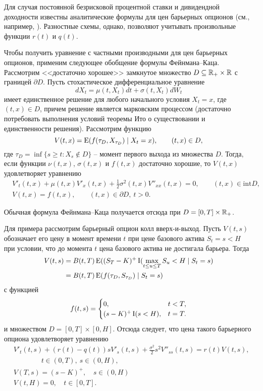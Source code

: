 \begin{remark}
Для случая постоянной безрисковой процентной ставки и дивидендной доходности известны аналитические формулы для цен барьерных опционов (см., например, \cite{Haug06}).
Разностные схемы, однако, позволяют учитывать произвольные функции $r(t)$ и $q(t)$.
\end{remark}

Чтобы получить уравнение с частными производными для цен барьерных опционов, применим следующее обобщение формулы Фейнмана--Каца.
Рассмотрим <<достаточно хорошее>> замкнутое множество  $D \subseteq \mathbb{R}_+\times \mathbb{R}$ с  границей $\partial D$. 
Пусть стохастическое дифференциальное уравнение
\[
d X_t = \mu(t,X_t) dt + \sigma(t,X_t) d W_t
\]
имеет единственное решение для любого начального условия $X_t=x$, где $(t,x)\in D$, причем решение является марковским процессом (достаточно потребовать выполнения условий теоремы Ито о существовании и единственности решения).
Рассмотрим функцию
\[
V(t,x) = \operatorname{E} (f(\tau_D, X_{\tau_D}) \mid X_t = x), \qquad (t,x) \in D,
\]
где $\tau_D = \inf\{s\ge t : X_s \not\in D\}$ -- момент первого выхода из множества $D$. 
Тогда, если функции $\nu(t,x)$, $\sigma(t,x)$ и $f(t,x)$ достаточно хорошие, то $V(t,x)$ удовлетворяет уравнению
\begin{align*}[left=\empheqlbrace]
&V'_t(t,x) + \mu(t,x)V'_x(t,x) + \frac12 \sigma^2(t,x) V''_{xx}(t,x) = 0, \qquad (t,x)\in\mathrm{int} D,\\
&V(t,x) = f(t, x), \qquad (t,x)\in \partial D,\ t>0.
\end{align*}
\begin{remark}
Обычная формула Фейнмана--Каца получается отсюда при $D=[0,T]\times \mathbb{R}_+$.
\end{remark}

Для примера рассмотрим барьерный опцион колл вверх-и-выход.
Пусть $V(t,s)$ обозначает его цену в момент времени $t$ при цене базового актива $S_t=s<H$ при условии, что до момента $t$ цена базового актива не достигала барьера.
Тогда 
\[
\begin{split}
V(t,s) &= B(t,T) \operatorname{E}((S_T-K)^+\operatorname{I}(\max_{t\le u \le T} S_u < H \mid S_t = s) \\
&= B(t,T) \operatorname{E}(f(\tau_D, S_{\tau_D}) \mid S_t=s)
\end{split}
\]
с функцией 
\[
f(t,s) = \begin{cases}
0, &t<T,\\
(s-K)^+\operatorname{I}(s<H), &t=T.
\end{cases}
\]
и множеством $D = [0,T]\times[0, H]$.
Отсюда следует, что цена такого барьерного опциона удовлетворяет уравнению
\begin{align*}[left=\empheqlbrace]
&V'_t(t,s) + (r(t)-q(t))sV'_s(t,s) + \frac{\sigma^2}{2} s^2 V''_{ss}(t,s) = r(t)V(t,s), \\ &\qquad\qquad t\in(0,T),\ s\in(0,H),\\
&V(T,s) = (s-K)^+, \quad s\in (0, H)\\
&V(t,H) = 0, \quad t\in[0,T].
\end{align*}

